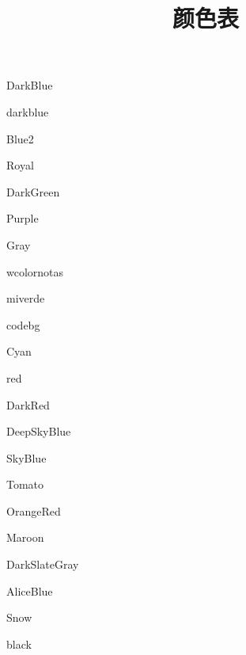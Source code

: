 \documentclass[10pt,fontset=adobe,UTF8]{ctexart}
\title{颜色表}
\begin{document}
\maketitle

{\color{DarkBlue} DarkBlue}

{\color{darkblue} darkblue}

{\color{Blue2} Blue2}

{\color{Royal} Royal}

{\color{DarkGreen} DarkGreen}

{\color{Purple} Purple}

{\color{Gray} Gray}

{\color{wcolornotas} wcolornotas}

{\color{miverde} miverde}


{\color{codebg} codebg}


{\color{Cyan} Cyan}


{\color{red} red}

{\color{DarkRed} DarkRed}

{\color{DeepSkyBlue} DeepSkyBlue}

{\color{SkyBlue} SkyBlue}

{\color{Tomato} Tomato}

{\color{OrangeRed} OrangeRed}

{\color{Maroon} Maroon}

{\color{DarkSlateGray} DarkSlateGray}

{\color{AliceBlue} AliceBlue}

{\color{Snow} Snow}

{\color{black} black}
\end{document}
